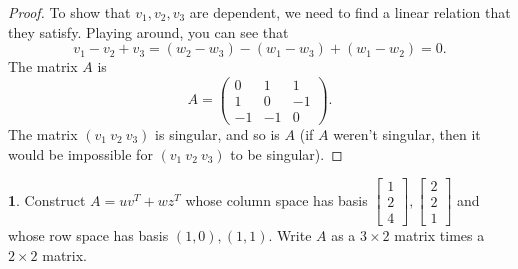 \documentclass{article}
\theoremstyle{definition}
\newtheorem{prob}{}
\begin{document}
\begin{proof}
	To show that $v_1, v_2, v_3$ are dependent, we need to find a linear relation that they satisfy. Playing around, you can see that 
\[v_1 - v_2 + v_3 = (w_2-w_3) - (w_1-w_3) + (w_1 - w_2) = 0.\]
The matrix $A$ is
\[A = \begin{pmatrix} 0 & 1 & 1 \\ 1 & 0 & -1 \\ -1 & -1 & 0 \end{pmatrix}. \]
The matrix $(v_1 \ v_2 \ v_3)$ is singular, and so is $A$ (if $A$ weren't singular, then it would be impossible for $(v_1 \ v_2 \ v_3)$ to be singular).
\end{proof}


\begin{prob}Construct $A = uv^T + wz^T$ whose column space has basis $\begin{bmatrix} 1 \\ 2 \\ 4 \end{bmatrix}, \begin{bmatrix} 2 \\ 2 \\ 1 \end{bmatrix}$ and whose row space has basis $(1,0), (1,1)$.  Write $A$ as a $3 \times 2$ matrix times a $2 \times 2$ matrix.
\end{prob}
\end{document}
